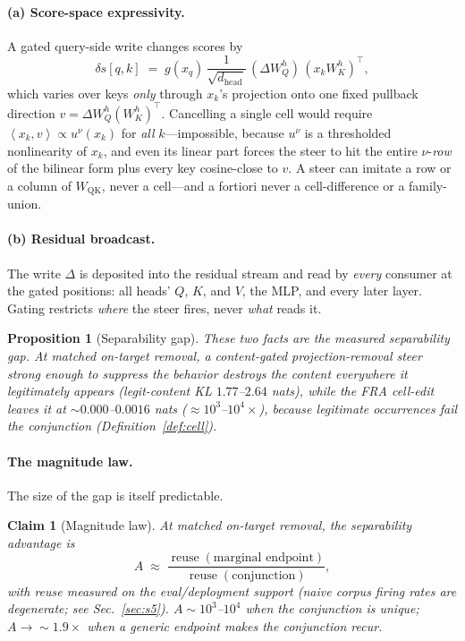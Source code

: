 \documentclass[11pt]{article}
\newcommand{\ip}[2]{\left\langle #1, #2 \right\rangle}
\newcommand{\dhead}{d_{\mathrm{head}}}
\newcommand{\QK}{\mathrm{QK}}
\newcommand{\reuse}{\operatorname{reuse}}
\theoremstyle{definition}
\theoremstyle{plain}
\newtheorem{proposition}{Proposition}
\newtheorem{claim}{Claim}
\theoremstyle{remark}
\begin{document}
\paragraph{(a) Score-space expressivity.} A gated query-side write changes scores by
\begin{equation}
  \delta s[q,k] \;=\; g(x_q)\,\frac{1}{\sqrt{\dhead}}\,(\Delta W_Q^h)\,(x_k W_K^h)^{\top},
\end{equation}
which varies over keys \emph{only} through $x_k$'s projection onto one fixed pullback direction $v = \Delta W_Q^h (W_K^h)^{\top}$. Cancelling a single cell would require $\ip{x_k}{v} \propto u^\nu(x_k)$ for \emph{all} $k$---impossible, because $u^\nu$ is a thresholded nonlinearity of $x_k$, and even its linear part forces the steer to hit the entire $\nu$-\emph{row} of the bilinear form plus every key cosine-close to $v$. A steer can imitate a row or a column of $W_{\QK}$, never a cell---and a fortiori never a cell-difference or a family-union.

\paragraph{(b) Residual broadcast.} The write $\Delta$ is deposited into the residual stream and read by \emph{every} consumer at the gated positions: all heads' $Q$, $K$, and $V$, the MLP, and every later layer. Gating restricts \emph{where} the steer fires, never \emph{what} reads it.

\begin{proposition}[Separability gap]\label{prop:gap}
These two facts \emph{are} the measured separability gap. At matched on-target removal, a content-gated projection-removal steer strong enough to suppress the behavior destroys the content everywhere it legitimately appears (legit-content KL $1.77$--$2.64$ nats), while the FRA cell-edit leaves it at ${\sim}0.000$--$0.0016$ nats ($\approx 10^3$--$10^4\times$), because legitimate occurrences fail the conjunction (Definition~\ref{def:cell}).
\end{proposition}

\paragraph{The magnitude law.} The size of the gap is itself predictable.

\begin{claim}[Magnitude law]\label{claim:magnitude}
At matched on-target removal, the separability advantage is
\begin{equation}
  A \;\approx\; \frac{\reuse(\text{marginal endpoint})}{\reuse(\text{conjunction})},
\end{equation}
with reuse measured on the eval/deployment support (naive corpus firing rates are degenerate; see Sec.~\ref{sec:s5}). $A \sim 10^3$--$10^4$ when the conjunction is unique; $A \to {\sim}1.9\times$ when a generic endpoint makes the conjunction recur.
\end{claim}
\end{document}
